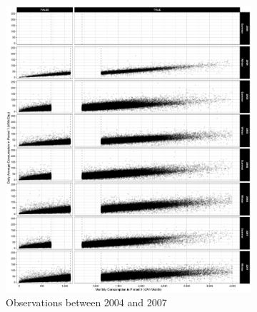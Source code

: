 \clearpage
\begin{figure}
    \begin{subfigure}{1.0\textwidth}
        \centering
        \includegraphics[scale = 0.12]{02_Plots/SMUD-Billing-Data_RD-Design_Scatter_Absolute-Consumption-in-H-Axis_RSEH_2004-2007}
        \caption{Observations between 2004 and 2007}  
    \end{subfigure}
    \begin{subfigure}{1.0\textwidth}
        \centering

\end{subfigure}
\end{figure}
